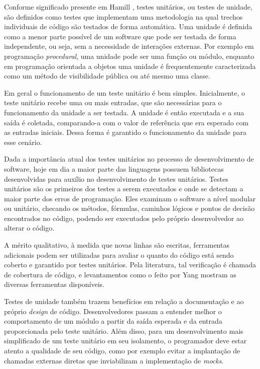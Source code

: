 Conforme significado presente em Hamill \cite{hamill}, testes unitários, ou testes de unidade, são definidos como testes que implementam uma metodologia na qual trechos individuais de código são testados de forma automática. Uma unidade é definida como a menor parte possível de um software que pode ser testada de forma independente, ou seja, sem a necessidade de interações externas. Por exemplo em programação \emph{procedural}, uma unidade pode ser uma função ou módulo, enquanto em programação orientada a objetos uma unidade é frequentemente caracterizada como um método de visibilidade pública ou até mesmo uma classe.

Em geral o funcionamento de um teste unitário é bem simples. Inicialmente, o teste unitário recebe uma ou mais entradas, que são necessárias para o funcionamento da unidade a ser testada. A unidade é então executada e a sua saída é coletada, comparando-a com o valor de referência que era esperado com as entradas iniciais. Dessa forma é garantido o funcionamento da unidade para esse cenário.

Dada a importância atual dos testes unitários no processo de desenvolvimento de software, hoje em dia a maior parte das linguagens possuem bibliotecas desenvolvidas para auxílio no desenvolvimento de testes unitários. Testes unitários são os primeiros dos testes a serem executados e onde se detectam a maior parte dos erros de programação. Eles examinam o software a nível modular ou unitário, checando os métodos, fórmulas, caminhos lógicos e pontos de decisão encontrados no código, podendo ser executados pelo próprio desenvolvedor ao alterar o código.

A mérito qualitativo, à medida que novas linhas são escritas, ferramentas adicionais podem ser utilizadas para avaliar o quanto do código está sendo coberto e garantido por testes unitários. Pela literatura, tal verificação é chamada de cobertura de código, e levantamentos como o feito por Yang \cite{yang} mostram as diversas ferramentas disponíveis.

Testes de unidade também trazem benefícios em relação a documentação e ao próprio \emph{design} de código. Desenvolvedores passam a entender melhor o comportamento de um módulo a partir da saída esperada e da entrada proporcionada pelo teste unitário. Além disso, para um desenvolvimento mais simplificado de um teste unitário em seu isolamento, o programador deve estar atento a qualidade de seu código, como por exemplo evitar a implantação de chamadas externas diretas que inviabilizam a implementação de \emph{mocks}.
